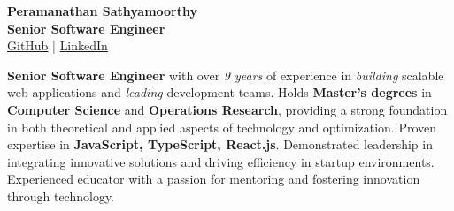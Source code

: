 \begin{minipage}[t]{0.61\textwidth}
\setlength{\parskip}{1ex}%

\vspace{2ex}

\begin{center}
\vspace{2ex}
\textbf{\Huge Peramanathan Sathyamoorthy}\\[3pt]
\vspace{1ex}
\textbf{\Large Senior Software Engineer}\\[6pt]
\href{https://github.com/p10ns11y}{\color{contentarealinkcolor}GitHub} | \href{https://www.linkedin.com/in/sathyam-peram/}{\color{contentarealinkcolor}LinkedIn}
\end{center}

\vspace{0.5em}
\Large
\textbf{Senior Software Engineer} with over \textit{9 years} of experience in \textit{building} scalable web applications and \textit{leading} development teams.
Holds \textbf{Master's degrees} in \textbf{Computer Science} and \textbf{Operations Research}, providing a strong foundation in both theoretical and applied aspects of technology and optimization.
Proven expertise in \textbf{JavaScript, TypeScript, React.js}. Demonstrated leadership in integrating innovative solutions and driving efficiency in startup environments.
Experienced educator with a passion for mentoring and fostering innovation through technology.

\vspace{1ex}

\vspace{0.5em}


\end{minipage}
